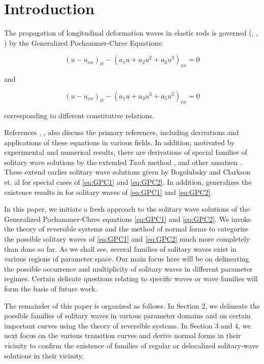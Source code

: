 \section{Introduction}

The propagation of longitudinal deformation waves in elastic rods is governed
(\cite{LCZ}, \cite{Runz}, \cite{WM}) by the Generalized Pochammer-Chree
Equations:

\begin{equation}\label{eq:GPC1}
\left( u - u_{xx} \right)_{tt} - \left( a_1 u + a_2 u^2 + a_3 u^3 \right)_{xx} =0  
\end{equation}

and

\begin{equation}  \label{eq:GPC2} 
\left( u - u_{xx} \right)_{tt} - \left( a_1 u + a_3 u^3 + a_5 u^5 \right)_{xx} =0
\end{equation}

corresponding to different constitutive relations.

References \cite{LCZ}, \cite{Runz}, \cite{WM} also discuss the primary
references, including derivations and applications of these equations in
various fields. In addition, motivated by experimental and numerical results,
there are derivations of special families of solitary wave solutions by the
extended $Tanh$ method \cite{LCZ}, and other ansatzen \cite{WM}. These extend
earlier solitary wave solutions given by Bogolubsky \cite{Bogo} and Clarkson
et. al \cite{CLVS} for special cases of \eqref{eq:GPC1} and \eqref{eq:GPC2}. In
addition, \cite{Runz} generalizes the existence results in \cite{Sax} for
solitary waves of \eqref{eq:GPC1} and \eqref{eq:GPC2}.  

In this paper, we initiate a fresh approach to the solitary wave solutions of
the Generalized Pochammer-Chree equations \eqref{eq:GPC1} and \eqref{eq:GPC2}.
We invoke the theory of reversible systems and the method of normal forms to
categorize the possible solitary waves of \eqref{eq:GPC1} and \eqref{eq:GPC2}
much more completely than done so far.  As we shall see, several families of
solitary waves exist in various regions of parameter space. Our main focus here
will be on delineating the possible occurrence and multiplicity of solitary
waves in different parameter regimes. Certain delicate questions relating to
specific waves or wave families will form the basis of future work. 

The remainder of this paper is organized as follows. In Section 2, we delineate
the possible families of solitary waves in various parameter domains and on
certain important curves using the theory of reversible systems. In Section 3
and 4, we next focus on the various transition curves and derive normal forms
in their vicinity to confirm the existence of families of regular or
delocalized solitary-wave solutions in their vicinity.
